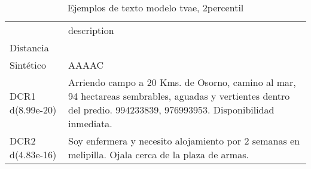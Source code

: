 \begin{table}[H]
\centering
\fontsize{10}{14}\selectfont
\caption{Ejemplos de texto modelo tvae, 2percentil}
\label{table-example-economicos-b-2-tvae-2p-text}
\begin{tabular}{|l|m{35em}|}
\hline
\rowcolor[gray]{0.8}
 & description \\
Distancia &  \\
\hline Sintético & AAAAC \\
\hline DCR1 d(8.99e-20) & Arriendo campo a 20 Kms. de Osorno, camino al mar, 94 hectareas sembrables, aguadas y vertientes dentro del predio. 994233839, 976993953. Disponibilidad inmediata. \\
\hline DCR2 d(4.83e-16) & Soy enfermera y necesito alojamiento por 2 semanas en melipilla. Ojala cerca de la plaza de armas. \\
\hline
\end{tabular}
\end{table}
